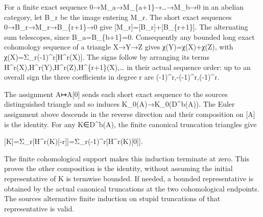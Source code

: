 For a finite exact sequence 0\allowbreak{}→M\_\allowbreak{}a\allowbreak{}→M\_\allowbreak{}\{a\allowbreak{}+1\}\allowbreak{}→…\allowbreak{}→M\_\allowbreak{}b\allowbreak{}→0 in an abelian category,\allowbreak{} let B\_\allowbreak{}r be the image entering M\_\allowbreak{}r. The short exact sequences 0\allowbreak{}→B\_\allowbreak{}r\allowbreak{}→M\_\allowbreak{}r\allowbreak{}→B\_\allowbreak{}\{r\allowbreak{}+1\}\allowbreak{}→0 give [M\_\allowbreak{}r]\allowbreak{}\allowbreak{}=[B\_\allowbreak{}r]\allowbreak{}\allowbreak{}+[B\_\allowbreak{}\{r\allowbreak{}+1\}]\allowbreak{}. The alternating sum telescopes,\allowbreak{} since B\_\allowbreak{}a\allowbreak{}=B\_\allowbreak{}\{b\allowbreak{}+1\}\allowbreak{}=0. Consequently any bounded long exact cohomology sequence of a triangle X\allowbreak{}→Y\allowbreak{}→Z gives χ(Y)\allowbreak{}\allowbreak{}=χ(X)\allowbreak{}\allowbreak{}+χ(Z)\allowbreak{},\allowbreak{} with χ(X)\allowbreak{}\allowbreak{}=Σ\_\allowbreak{}r(-1)\allowbreak{}\textasciicircum{}r[H\textasciicircum{}r(X)\allowbreak{}]\allowbreak{}. The signs follow by arranging its terms H\textasciicircum{}r(X)\allowbreak{},\allowbreak{}H\textasciicircum{}r(Y)\allowbreak{},\allowbreak{}H\textasciicircum{}r(Z)\allowbreak{},\allowbreak{}H\textasciicircum{}\{r\allowbreak{}+1\}(X)\allowbreak{},\allowbreak{}… in their actual sequence order:\allowbreak{} up to an overall sign the three coefficients in degree r are (-1)\allowbreak{}\textasciicircum{}r,\allowbreak{}-(-1)\allowbreak{}\textasciicircum{}r,\allowbreak{}(-1)\allowbreak{}\textasciicircum{}r.

The assignment A\allowbreak{}↦A[0]\allowbreak{} sends each short exact sequence to the source\textquotesingle s distinguished triangle and so induces K\_\allowbreak{}0(A)\allowbreak{}\allowbreak{}→K\_\allowbreak{}0(D\textasciicircum{}b(A)\allowbreak{})\allowbreak{}. The Euler assignment above descends in the reverse direction and their composition on [A]\allowbreak{} is the identity. For any K\allowbreak{}∈D\textasciicircum{}b(A)\allowbreak{},\allowbreak{} the finite canonical truncation triangles give

[K]\allowbreak{}\allowbreak{}=Σ\_\allowbreak{}r[H\textasciicircum{}r(K)\allowbreak{}[-r]\allowbreak{}]\allowbreak{}\allowbreak{}=Σ\_\allowbreak{}r(-1)\allowbreak{}\textasciicircum{}r[H\textasciicircum{}r(K)\allowbreak{}[0]\allowbreak{}]\allowbreak{}.

The finite cohomological support makes this induction terminate at zero. This proves the other composition is the identity,\allowbreak{} without assuming the initial representative of K is termwise bounded. If needed,\allowbreak{} a bounded representative is obtained by the actual canonical truncations at the two cohomological endpoints. The source\textquotesingle s alternative finite induction on stupid truncations of that representative is valid.


